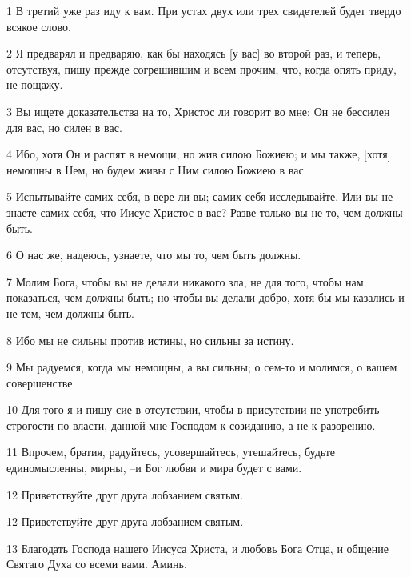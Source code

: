 \par 1 В третий уже раз иду к вам. При устах двух или трех свидетелей будет твердо всякое слово.
\par 2 Я предварял и предваряю, как бы находясь [у вас] во второй раз, и теперь, отсутствуя, пишу прежде согрешившим и всем прочим, что, когда опять приду, не пощажу.
\par 3 Вы ищете доказательства на то, Христос ли говорит во мне: Он не бессилен для вас, но силен в вас.
\par 4 Ибо, хотя Он и распят в немощи, но жив силою Божиею; и мы также, [хотя] немощны в Нем, но будем живы с Ним силою Божиею в вас.
\par 5 Испытывайте самих себя, в вере ли вы; самих себя исследывайте. Или вы не знаете самих себя, что Иисус Христос в вас? Разве только вы не то, чем должны быть.
\par 6 О нас же, надеюсь, узнаете, что мы то, чем быть должны.
\par 7 Молим Бога, чтобы вы не делали никакого зла, не для того, чтобы нам показаться, чем должны быть; но чтобы вы делали добро, хотя бы мы казались и не тем, чем должны быть.
\par 8 Ибо мы не сильны против истины, но сильны за истину.
\par 9 Мы радуемся, когда мы немощны, а вы сильны; о сем-то и молимся, о вашем совершенстве.
\par 10 Для того я и пишу сие в отсутствии, чтобы в присутствии не употребить строгости по власти, данной мне Господом к созиданию, а не к разорению.
\par 11 Впрочем, братия, радуйтесь, усовершайтесь, утешайтесь, будьте единомысленны, мирны, --и Бог любви и мира будет с вами.
\par 12 Приветствуйте друг друга лобзанием святым.
\par 12 Приветствуйте друг друга лобзанием святым.
\par 13 Благодать Господа нашего Иисуса Христа, и любовь Бога Отца, и общение Святаго Духа со всеми вами. Аминь.


